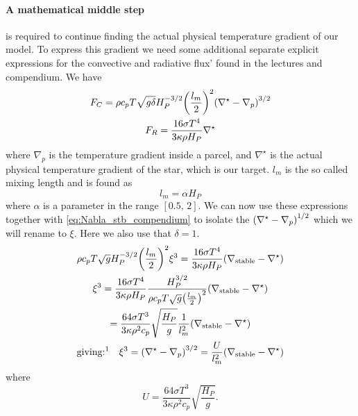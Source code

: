 \documentclass[11pt,a4paper,twocolumn,titlepage]{article}
\newcommand{\nablastb}
{
\nabla_{\text{stable}}
}
\newcommand{\nablastar}
{
\nabla^\star
}
\newcommand{\nablap}
{
\nabla_{p}
}
\begin{document}
\paragraph{A mathematical middle step} is required to continue finding the actual physical temperature gradient of our model. To express this gradient we need some additional separate explicit expressions for the convective and radiative flux' found in the lectures and compendium. We have
\begin{gather}
F_C = \rho c_p T \sqrt{g\delta}H_P^{-3/2} \qty(\frac{l_m}{2})^2\qty(\nablastar-\nablap)^{3/2} \label{eq:Convective_flux}
\\
F_R = \frac{16\sigma T^4}{3\kappa\rho H_P}\nablastar \label{eq:Radiative_flux_reality}
\end{gather}
where $\nablap$ is the temperature gradient inside a parcel, and $\nablastar$ is the actual physical temperature gradient of the star, which is our target. $l_m$ is the so called mixing length and is found as
\begin{equation}
l_m = \alpha H_P \label{eq:Mixing_length}
\end{equation}
where $\alpha$ is a parameter in the range $[0.5,\, 2]$. We can now use these expressions together with \cref{eq:Nabla_stb_compendium} to isolate the $\qty(\nablastar-\nablap)^{1/2}$ which we will rename to $\xi$. Here we also use that $\delta = 1$.
\begin{gather}
\rho c_p T \sqrt{g}H_P^{-3/2} \qty(\frac{l_m}{2})^2 \xi^3= \frac{16\sigma T^4}{3\kappa\rho H_P}\qty(\nablastb-\nablastar) \notag
\\
\xi^3 = \frac{16\sigma T^4}{3\kappa\rho H_P}\frac{H_P^{3/2}}{\rho c_p T \sqrt{g}\qty(\frac{l_m}{2})^2} \qty(\nablastb-\nablastar) \notag
\\
= \frac{64 \sigma T^3}{3\kappa\rho^2 c_p}\sqrt{\frac{H_P}{g}}\frac{1}{l_m^2}\qty(\nablastb-\nablastar) \notag
\\
\qq*{giving:\footnotemark} \xi^3= \qty(\nablastar - \nablap)^{3/2} = \frac{U}{l_m^2}\qty(\nablastb-\nablastar) \label{eq:Xi_exe_11}
\end{gather}
where 
\begin{equation}
U = \frac{64 \sigma T^3}{3\kappa\rho^2 c_p}\sqrt{\frac{H_P}{g}}. \label{eq:U}
\end{equation}
\end{document}
